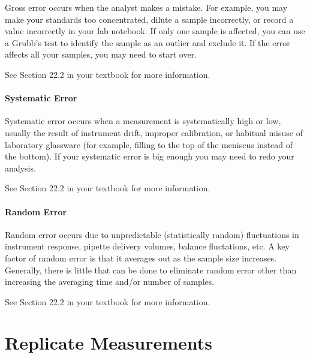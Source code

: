 \documentclass[]{tufte-book}
\begin{document}
Gross error occurs when the analyst makes a mistake. For example, you may make your standards too concentrated, dilute a sample incorrectly, or record a value incorrectly in your lab notebook. If only one sample is affected, you can use a Grubb's test to identify the sample as an outlier and exclude it. If the error affects all your samples, you may need to start over.

See Section 22.2 in your textbook for more information.

\hypertarget{systematic-error}{%
\paragraph{\texorpdfstring{\textbf{Systematic Error}}{Systematic Error}}\label{systematic-error}}

Systematic error occurs when a measurement is systematically high or low, usually the result of instrument drift, improper calibration, or habitual misuse of laboratory glassware (for example, filling to the top of the meniscus instead of the bottom). If your systematic error is big enough you may need to redo your analysis.

See Section 22.2 in your textbook for more information.

\hypertarget{random-error}{%
\paragraph{\texorpdfstring{\textbf{Random Error}}{Random Error}}\label{random-error}}

Random error occurs due to unpredictable (statistically random) fluctuations in instrument response, pipette delivery volumes, balance fluctations, etc. A key factor of random error is that it averages out as the sample size increases. Generally, there is little that can be done to eliminate random error other than increasing the averaging time and/or number of samples.

See Section 22.2 in your textbook for more information.

\hypertarget{replicate-measurements}{%
\section*{Replicate Measurements}\label{replicate-measurements}}
\end{document}
